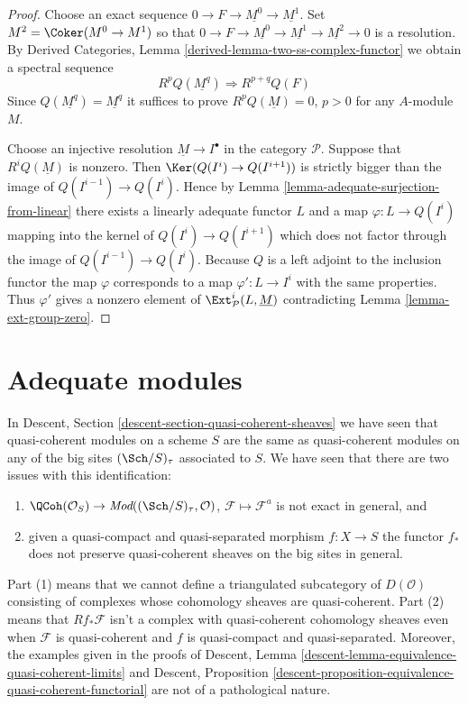 \begin{proof}
Choose an exact sequence $0 \to F \to \underline{M^0} \to \underline{M^1}$.
Set $M^2 = \Coker(M^0 \to M^1)$ so that
$0 \to F \to \underline{M^0} \to \underline{M^1}
\to \underline{M^2} \to 0$ is a resolution. By
Derived Categories, Lemma \ref{derived-lemma-two-ss-complex-functor}
we obtain a spectral sequence
$$
R^pQ(\underline{M^q}) \Rightarrow R^{p + q}Q(F)
$$
Since $Q(\underline{M^q}) = \underline{M^q}$ it suffices to prove
$R^pQ(\underline{M}) = 0$, $p > 0$ for any $A$-module $M$.

\medskip\noindent
Choose an injective resolution $\underline{M} \to I^\bullet$ in
the category $\mathcal{P}$. Suppose that $R^iQ(\underline{M})$ is nonzero.
Then $\Ker(Q(I^i) \to Q(I^{i + 1}))$ is strictly bigger
than the image of $Q(I^{i - 1}) \to Q(I^i)$. Hence by
Lemma \ref{lemma-adequate-surjection-from-linear}
there exists a linearly adequate functor $L$ and a map
$\varphi : L \to Q(I^i)$ mapping into the kernel of $Q(I^i) \to Q(I^{i + 1})$
which does not factor through the image of $Q(I^{i - 1}) \to Q(I^i)$.
Because $Q$ is a left adjoint to the inclusion functor the map
$\varphi$ corresponds to a map $\varphi' : L \to I^i$ with the same properties.
Thus $\varphi'$ gives a nonzero element of
$\Ext^i_\mathcal{P}(L, \underline{M})$ contradicting
Lemma \ref{lemma-ext-group-zero}.
\end{proof}














\section{Adequate modules}
\label{section-adequate}

\noindent
In
Descent, Section \ref{descent-section-quasi-coherent-sheaves}
we have seen that quasi-coherent modules on a scheme $S$
are the same as quasi-coherent modules on any of the big
sites $(\Sch/S)_\tau$ associated to $S$. We have seen that there
are two issues with this identification:
\begin{enumerate}
\item $\QCoh(\mathcal{O}_S) \to
\textit{Mod}((\Sch/S)_\tau, \mathcal{O})$,
$\mathcal{F} \mapsto \mathcal{F}^a$ is not exact in general, and
\item given a quasi-compact and quasi-separated morphism $f : X \to S$
the functor $f_*$ does not preserve quasi-coherent sheaves on the
big sites in general.
\end{enumerate}
Part (1) means that we cannot define a triangulated subcategory
of $D(\mathcal{O})$ consisting of complexes whose cohomology sheaves
are quasi-coherent. Part (2) means that $Rf_*\mathcal{F}$ isn't a
complex with quasi-coherent cohomology sheaves even when $\mathcal{F}$
is quasi-coherent and $f$ is quasi-compact and quasi-separated.
Moreover, the examples given in the proofs of
Descent, Lemma
\ref{descent-lemma-equivalence-quasi-coherent-limits}
and
Descent, Proposition
\ref{descent-proposition-equivalence-quasi-coherent-functorial}
are not of a pathological nature.

